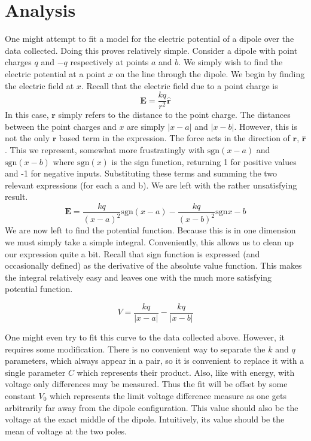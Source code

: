 \documentclass[11pt]{article}
\begin{document}
\section{Analysis}
One might attempt to fit a model for the electric potential of a dipole over the data collected. Doing this proves relatively simple. Consider a dipole with point charges \(q\) and \(-q\) respectively at points \(a\) and \(b\). We simply wish to find the electric potential at a point \(x\) on the line through the dipole. We begin by finding the electric field at \(x\). Recall that the electric field due to a point charge is
\begin{equation}
\mathbf{E} = \frac{k q}{r^2} \mathbf{\hat{r}}
\end{equation}
In this case, \(\mathbf{r}\) simply refers to the distance to the point charge. The distances between the point charges and \(x\) are simply \(|x-a|\) and \(|x-b|\). However, this is not the only \(\mathbf{r}\) based term in the expression. The force acts in the direction of \(\mathbf{r}\), \( \mathbf{\hat{r}} \). This we represent, somewhat more frustratingly with \(\mathrm{sgn}(x-a)\) and \(\mathrm{sgn}(x-b)\) where \(\mathrm{sgn}(x)\) is the sign function, returning 1 for positive values and -1 for negative inputs. Substituting these terms and summing the two relevant expressions (for each a and b). We are left with the rather unsatisfying result.
\begin{equation}
\mathbf{E} = \frac{k q}{(x-a)^2} \mathrm{sgn}(x-a) - \frac{k q}{(x-b)^2}\mathrm{sgn}{x-b}
\end{equation}
We are now left to find the potential function. Because this is in one dimension we must simply take a simple integral. Conveniently, this allows us to clean up our expression quite a bit. Recall that sign function is expressed (and occasionally defined) as the derivative of the absolute value function. This makes the integral relatively easy and leaves one with the much more satisfying potential function.

\begin{equation}
V = \frac{k q}{|x-a|} - \frac{k q}{|x-b|}
\end{equation}

One might even try to fit this curve to the data collected above. However, it requires some modification. There is no convenient way to separate the \(k\) and \(q\) parameters, which always appear in a pair, so it is convenient to replace it with a single parameter \(C\) which represents their product. Also, like with energy, with voltage only differences may be measured. Thus the fit will be offset by some constant \(V_0\) which represents the limit voltage difference measure as one gets arbitrarily far away from the dipole configuration. This value should also be the voltage at the exact middle of the dipole. Intuitively, its value should be the mean of voltage at the two poles.
\end{document}
